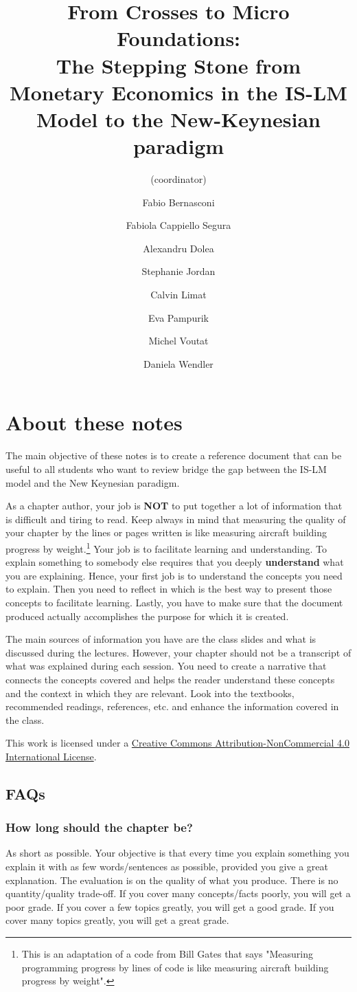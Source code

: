\documentclass[11pt,a4paper,oneside]{book}
\title{From Crosses to Micro Foundations:\\
The Stepping Stone from Monetary Economics in the IS-LM Model to the New-Keynesian paradigm}
\author{
  (coordinator)
  \and
  Fabio Bernasconi
  \and
  Fabiola Cappiello Segura
  \and
  Alexandru Dolea
  \and
  Stephanie Jordan
  \and
  Calvin Limat
  \and
  Eva Pampurik
  \and
  Michel Voutat
  \and
  Daniela Wendler
}
\begin{document}
\frontmatter
\maketitle

\chapter{About these notes}
The main objective of these notes is to create a reference document that can be useful to all students who want to review bridge the gap between the IS-LM model and the New Keynesian paradigm.

As a chapter author, your job is \textbf{NOT} to put together a lot of information that is difficult and tiring to read. Keep always in mind that measuring the quality of your chapter by the lines or pages written is like measuring aircraft building progress by weight.\footnote{This is an adaptation of a code from Bill Gates that says "Measuring programming progress by lines of code is like measuring aircraft building progress by weight".} Your job is to facilitate learning and understanding. To explain something to somebody else requires that you deeply \textbf{understand} what you are explaining. Hence, your first job is to understand the concepts you need to explain. Then you need to reflect in which is the best way to present those concepts to facilitate learning. Lastly, you have to make sure that the document produced actually accomplishes the purpose for which it is created.

The main sources of information you have are the class slides and what is discussed during the lectures. However, your chapter should not be a transcript of what was explained during each session. You need to create a narrative that connects the concepts covered and helps the reader understand these concepts and the context in which they are relevant. Look into the textbooks, recommended readings, references, etc. and enhance the information covered in the class.

This work is licensed under a \href{http://creativecommons.org/licenses/by-nc/4.0/}{Creative Commons Attribution-NonCommercial 4.0 International License}.

\newpage
\section*{FAQs}
\subsection*{How long should the chapter be?}
As short as possible. Your objective is that every time you explain something you explain it with as few words/sentences as possible, provided you give a great explanation. The evaluation is on the quality of what you produce. There is no quantity/quality trade-off. If you cover many concepts/facts poorly, you will get a poor grade. If you cover a few topics greatly, you will get a good grade. If you cover many topics greatly, you will get a great grade.
\end{document}
